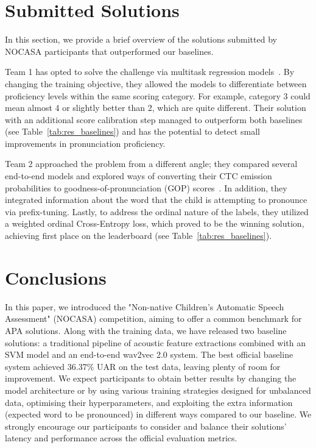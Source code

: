 \documentclass{article}
\begin{document}
\section{Submitted Solutions}
\label{sec:solutions}

In this section, we provide a brief overview of the solutions submitted by NOCASA participants that outperformed our baselines. 

Team 1 has opted to solve the challenge via multitask regression models~\cite{team1}. By changing the training objective, they allowed the models to differentiate between proficiency levels within the same scoring category. For example, category 3 could mean almost 4 or slightly better than 2, which are quite different. Their solution with an additional score calibration step managed to outperform both baselines (see Table~\ref{tab:res_baselines}) and has the potential to detect small improvements in pronunciation proficiency.

Team 2 approached the problem from a different angle; they compared several end-to-end models and explored ways of converting their CTC emission probabilities to goodness-of-pronunciation (GOP) scores~\cite{team2}. In addition, they integrated information about the word that the child is attempting to pronounce via prefix-tuning. Lastly, to address the ordinal nature of the labels, they utilized a weighted ordinal Cross-Entropy loss, which proved to be the winning solution, achieving first place on the leaderboard (see Table~\ref{tab:res_baselines}).

\section{Conclusions}

In this paper, we introduced the "Non-native Children's Automatic Speech Assessment" (NOCASA) competition, aiming to offer a common benchmark for APA solutions. Along with the training data, we have released two baseline solutions: a traditional pipeline of acoustic feature extractions combined with an SVM model and an end-to-end wav2vec 2.0 system. The best official baseline system achieved 36.37\% UAR on the test data, leaving plenty of room for improvement. We expect participants to obtain better results by changing the model architecture or by using various training strategies designed for unbalanced data, optimising their hyperparameters, and exploiting the extra information (expected word to be pronounced) in different ways compared to our baseline. We strongly encourage our participants to consider and balance their solutions' latency and performance across the official evaluation metrics.
\end{document}
